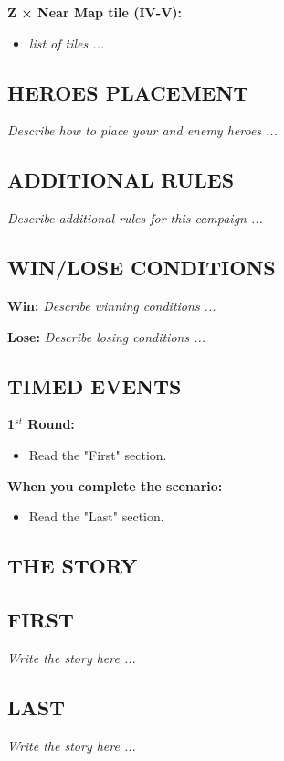 \begin{multicols*}{2}
\textbf{Z × Near Map tile (IV-V):}
\begin{itemize}
    \item \textit{list of tiles ...}
\end{itemize}

\subsection*{\MakeUppercase{Heroes placement}}

\textit{Describe how to place your and enemy heroes ...}

\subsection*{\MakeUppercase{Additional rules}}

\textit{Describe additional rules for this campaign ...}

\subsection*{\MakeUppercase{Win/lose conditions}}

\textbf{Win:} \textit{Describe winning conditions ...}

\textbf{Lose:} \textit{Describe losing conditions ...}

\subsection*{\MakeUppercase{Timed events}}

\textbf{1$^{st}$ Round:}
\begin{itemize}
    \item Read the "First" section.
\end{itemize}

\textbf{When you complete the scenario:}
\begin{itemize}
    \item Read the "Last" section.
\end{itemize}

\newpage

\begin{center}
    \section*{THE STORY}
\end{center}

\subsection*{\MakeUppercase{First}}

\textit{Write the story here ...}

\subsection*{\MakeUppercase{Last}}

\textit{Write the story here ...}

\end{multicols*}
